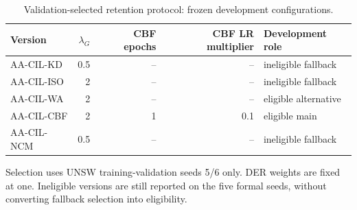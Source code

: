 \begin{table}[t]
\centering\scriptsize
\setlength{\tabcolsep}{3.8pt}
\caption{Validation-selected retention protocol: frozen development configurations.}\label{tab:retention-selection}
\begin{tabular}{lrrrl}
\toprule
Version & $\lambda_G$ & CBF epochs & CBF LR multiplier & Development role \\
\midrule
AA-CIL-KD & 0.5 & -- & -- & ineligible fallback \\
AA-CIL-ISO & 2 & -- & -- & ineligible fallback \\
AA-CIL-WA & 2 & -- & -- & eligible alternative \\
AA-CIL-CBF & 2 & 1 & 0.1 & eligible main \\
AA-CIL-NCM & 0.5 & -- & -- & ineligible fallback \\
\bottomrule
\end{tabular}
\par\vspace{2pt}\begin{minipage}{.98\linewidth}\footnotesize Selection uses UNSW training-validation seeds 5/6 only. DER weights are fixed at one. Ineligible versions are still reported on the five formal seeds, without converting fallback selection into eligibility.\end{minipage}
\end{table}
